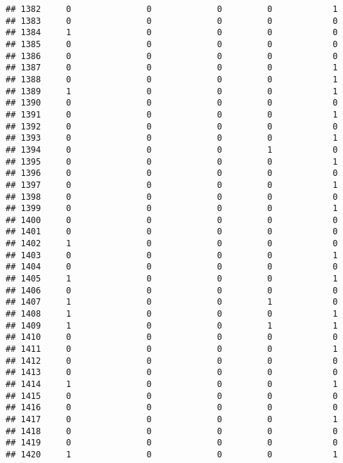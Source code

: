 \documentclass[]{article}
\begin{document}
\begin{verbatim}
## 1382     0               0             0         0            1
## 1383     0               0             0         0            0
## 1384     1               0             0         0            0
## 1385     0               0             0         0            0
## 1386     0               0             0         0            0
## 1387     0               0             0         0            1
## 1388     0               0             0         0            1
## 1389     1               0             0         0            1
## 1390     0               0             0         0            0
## 1391     0               0             0         0            1
## 1392     0               0             0         0            0
## 1393     0               0             0         0            1
## 1394     0               0             0         1            0
## 1395     0               0             0         0            1
## 1396     0               0             0         0            0
## 1397     0               0             0         0            1
## 1398     0               0             0         0            0
## 1399     0               0             0         0            1
## 1400     0               0             0         0            0
## 1401     0               0             0         0            0
## 1402     1               0             0         0            0
## 1403     0               0             0         0            1
## 1404     0               0             0         0            0
## 1405     1               0             0         0            1
## 1406     0               0             0         0            0
## 1407     1               0             0         1            0
## 1408     1               0             0         0            1
## 1409     1               0             0         1            1
## 1410     0               0             0         0            0
## 1411     0               0             0         0            1
## 1412     0               0             0         0            0
## 1413     0               0             0         0            0
## 1414     1               0             0         0            1
## 1415     0               0             0         0            0
## 1416     0               0             0         0            0
## 1417     0               0             0         0            1
## 1418     0               0             0         0            0
## 1419     0               0             0         0            0
## 1420     1               0             0         0            1

\end{verbatim}
\end{document}
